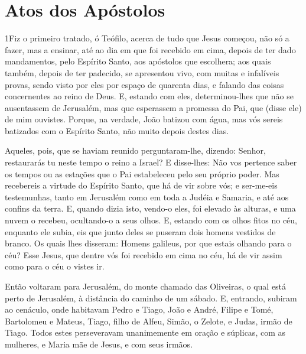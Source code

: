 \thispagestyle{empty}
\chapter*{Atos dos Apóstolos}

\lettrine{1} Fiz o primeiro tratado, ó Teófilo, acerca de tudo
que Jesus começou, não só a fazer, mas a ensinar, até ao dia em
que foi recebido em cima, depois de ter dado mandamentos, pelo
Espírito Santo, aos apóstolos que escolhera; aos quais também,
depois de ter padecido, se apresentou vivo, com muitas e infalíveis
provas, sendo visto por eles por espaço de quarenta dias, e falando
das coisas concernentes ao reino de Deus. E, estando com eles,
determinou-lhes que não se ausentassem de Jerusalém, mas que
esperassem a promessa do Pai, que (disse ele) de mim ouvistes.
Porque, na verdade, João batizou com água, mas vós sereis
batizados com o Espírito Santo, não muito depois destes dias.

Aqueles, pois, que se haviam reunido perguntaram-lhe, dizendo:
Senhor, restaurarás tu neste tempo o reino a Israel? E
disse-lhes: Não vos pertence saber os tempos ou as estações que o
Pai estabeleceu pelo seu próprio poder. Mas recebereis a virtude
do Espírito Santo, que há de vir sobre vós; e ser-me-eis
testemunhas, tanto em Jerusalém como em toda a Judéia e Samaria, e
até aos confins da terra. E, quando dizia isto, vendo-o eles,
foi elevado às alturas, e uma nuvem o recebeu, ocultando-o a seus
olhos. E, estando com os olhos fitos no céu, enquanto ele
subia, eis que junto deles se puseram dois homens vestidos de
branco. Os quais lhes disseram: Homens galileus, por que
estais olhando para o céu? Esse Jesus, que dentre vós foi recebido
em cima no céu, há de vir assim como para o céu o vistes ir.

Então voltaram para Jerusalém, do monte chamado das Oliveiras, o
qual está perto de Jerusalém, à distância do caminho de um sábado.
E, entrando, subiram ao cenáculo, onde habitavam Pedro e
Tiago, João e André, Filipe e Tomé, Bartolomeu e Mateus, Tiago,
filho de Alfeu, Simão, o Zelote, e Judas, irmão de Tiago.
Todos estes perseveravam unanimemente em oração e súplicas,
com as mulheres, e Maria mãe de Jesus, e com seus irmãos.

